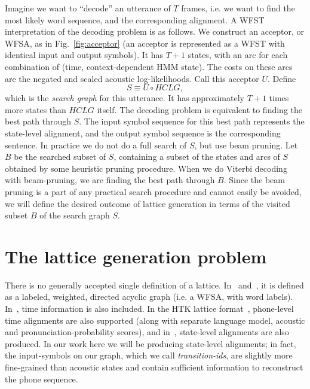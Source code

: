 \documentclass{article}
\def\HCLG{{\mathit{HCLG}}}
\begin{document}
Imagine we want to ``decode'' an utterance of $T$ frames, i.e. we want to
find the most likely word sequence, and the corresponding alignment.  A WFST
interpretation of the decoding problem is as follows.  We construct an
acceptor, or WFSA, as in Fig.~\ref{fig:acceptor} (an acceptor is represented as a
WFST with identical input and output symbols).  It has $T{+}1$ states,
with an arc for each combination of (time, context-dependent HMM state).  The
costs on these arcs are the negated and scaled acoustic log-likelihoods.
Call this acceptor $U$.  Define
\begin{equation}
   S \equiv U \circ \HCLG,
\end{equation}
which is the {\em search graph} for this utterance.  It has approximately $T+1$ times
more states than $\HCLG$ itself.  The decoding problem is equivalent to finding
the best path through $S$.  The input symbol sequence for this best path represents
the state-level alignment, and the output symbol sequence is the corresponding
sentence.  In practice we do not do a full search of $S$, but use beam pruning.
Let $B$ be the searched subset of $S$, containing a subset of the states and arcs
of $S$ obtained by some heuristic pruning procedure.  
When we do Viterbi decoding with beam-pruning, we are finding the best path through $B$. 
%
Since the beam pruning is a part of any practical search procedure and cannot
easily be avoided, we will define the desired outcome of lattice generation in terms
of the visited subset $B$ of the search graph $S$.

\section{The lattice generation problem}
\label{sec:lattices}


There is no generally accepted single definition of a lattice.  In~\cite{efficient_general}
and~\cite{sak2010fly}, it is defined as a labeled, weighted, directed acyclic graph
(i.e. a WFSA, with word labels).  In~\cite{ney_word_graph}, time information
is also included.  In the HTK lattice format~\cite{htkbook}, phone-level time alignments 
are also supported (along with separate language model, acoustic and pronunciation-probability 
scores), and in~\cite{saon2005anatomy}, state-level alignments are also produced.
In our work here we will be producing state-level alignments; in fact, the input-symbols
on our graph, which we call {\em transition-ids}, are slightly more fine-grained
than acoustic states and contain sufficient information to reconstruct the phone
sequence.  
\end{document}
